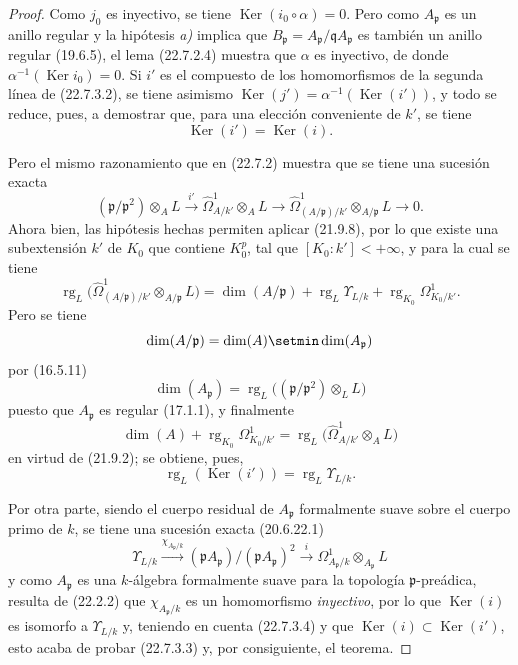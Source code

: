 \begin{proof}
Como $j_0$ es inyectivo, se tiene $\operatorname{Ker}(i_0\circ\alpha)=0$. Pero como
$A_{\mathfrak p}$ es un anillo regular y la hipótesis \emph{a)} implica que
$B_{\mathfrak p}=A_{\mathfrak p}/\mathfrak qA_{\mathfrak p}$ es también un
anillo regular (19.6.5), el lema (22.7.2.4) muestra que $\alpha$ es inyectivo,
de donde $\alpha^{-1}(\operatorname{Ker} i_0)=0$. Si $i'$ es el compuesto de los homomorfismos de la
segunda línea de (22.7.3.2), se tiene asimismo
$\operatorname{Ker}(j')=\alpha^{-1}(\operatorname{Ker}(i'))$, y todo se reduce, pues, a demostrar que, para una
elección conveniente de $k'$, se tiene
\begin{equation}
\label{0.22.7.3.3-fr}
  \operatorname{Ker}(i')=\operatorname{Ker}(i).
  \tag{22.7.3.3}
\end{equation}

Pero el mismo razonamiento que en (22.7.2) muestra que se tiene una sucesión exacta
\[
  (\mathfrak p/\mathfrak p^2)\otimes_AL\xrightarrow{i'}
  \widehat\Omega^1_{A/k'}\otimes_AL\longrightarrow
  \widehat\Omega^1_{(A/\mathfrak p)/k'}\otimes_{A/\mathfrak p}L
  \longrightarrow0.
\]
Ahora bien, las hipótesis hechas permiten aplicar (21.9.8), por lo que existe una
subextensión $k'$ de $K_0$ que contiene $K_0^p$, tal que
$[K_0:k']<+\infty$, y para la cual se tiene
\[
  \operatorname{rg}_L\bigl(\widehat\Omega^1_{(A/\mathfrak p)/k'}
  \otimes_{A/\mathfrak p}L\bigr)
  =\dim(A/\mathfrak p)+\operatorname{rg}_L\Upsilon_{L/k}
  +\operatorname{rg}_{K_0}\Omega^1_{K_0/k'}.
\]
Pero se tiene
\[
  \dim(A/\mathfrak p)=\dim(A)\setmin\dim(A_{\mathfrak p})
\]
por (16.5.11)
\[
  \dim(A_{\mathfrak p})
  =\operatorname{rg}_L\bigl((\mathfrak p/\mathfrak p^2)\otimes_LL\bigr)
\]
puesto que $A_{\mathfrak p}$ es regular (17.1.1), y finalmente
\[
  \dim(A)+\operatorname{rg}_{K_0}\Omega^1_{K_0/k'}
  =\operatorname{rg}_L\bigl(\widehat\Omega^1_{A/k'}\otimes_AL\bigr)
\]
en virtud de (21.9.2); se obtiene, pues,
\begin{equation}
\label{0.22.7.3.4-fr}
  \operatorname{rg}_L(\operatorname{Ker}(i'))=\operatorname{rg}_L\Upsilon_{L/k}.
  \tag{22.7.3.4}
\end{equation}

Por otra parte, siendo el cuerpo residual de $A_{\mathfrak p}$ formalmente suave
sobre el cuerpo primo de $k$, se tiene una sucesión exacta (20.6.22.1)
\[
  \Upsilon_{L/k}\xrightarrow{\chi_{A_{\mathfrak p}/k}}
  (\mathfrak pA_{\mathfrak p})/(\mathfrak pA_{\mathfrak p})^2
  \xrightarrow{i}\Omega^1_{A_{\mathfrak p}/k}
  \otimes_{A_{\mathfrak p}}L
\]
y como $A_{\mathfrak p}$ es una $k$-álgebra formalmente suave para la
topología $\mathfrak p$-preádica, resulta de (22.2.2) que
$\chi_{A_{\mathfrak p}/k}$ es un homomorfismo \emph{inyectivo}, por lo que $\operatorname{Ker}(i)$ es
isomorfo a $\Upsilon_{L/k}$ y, teniendo en cuenta (22.7.3.4) y que
$\operatorname{Ker}(i)\subset\operatorname{Ker}(i')$, esto acaba de probar (22.7.3.3) y, por consiguiente, el
teorema.
\end{proof}


